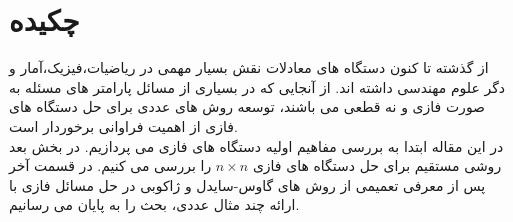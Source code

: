 \section{چکیده} 

از گذشته تا کنون دستگاه های معادلات نقش بسیار مهمی در ریاضیات،‌فیزیک،‌آمار و دگر علوم مهندسی داشته اند. از آنجایی که در بسیاری از مسائل پارامتر های مسئله به صورت فازی  و نه قطعی  می باشند،‌ توسعه روش های عددی برای حل دستگاه های فازی از اهمیت فراوانی برخوردار است.\\ 
در این مقاله ابتدا به بررسی مفاهیم اولیه دستگاه های فازی می پردازیم. در بخش بعد روشی مستقیم برای حل دستگاه های فازی $ n \times n $ را بررسی می کنیم. در قسمت آخر پس از معرفی تعمیمی از روش های گاوس-سایدل و ژاکوبی در حل مسائل فازی با ارائه چند مثال عددی، بحث را به پایان می رسانیم. 
